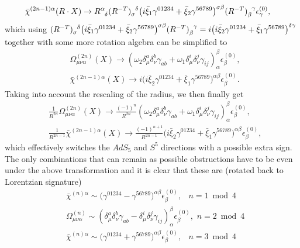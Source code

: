 \documentclass[12pt]{article}
\def\be{\begin{equation}}
\def\ee{\end{equation}}
\numberwithin{equation}{section}
\begin{document}
\begin{equation}
\begin{aligned}
	&\bar{\chi}^{(2n-1)\alpha}(R \cdot X) \to \tensor{R}{^\alpha_\delta} \tensor{(R^{-T})}{_\sigma^\delta} \big(i\bar{\xi}_1 \gamma^{01234} + \bar{\xi}_2\gamma^{56789}\big)^{\sigma \beta} \tensor{(R^{-T})}{_\beta^\gamma} \epsilon^{(0)}_\gamma,
\end{aligned}
\ee
which using $\tensor{(R^{-T})}{_\sigma^\delta} \big(i\bar{\xi}_1 \gamma^{01234} + \bar{\xi}_2 \gamma^{56789}\big)^{\sigma \beta} \tensor{(R^{-T})}{_\beta^\gamma} = i  \big(i \bar{\xi}_2 \gamma^{01234} + \bar{\xi}_1 \gamma^{56789}\big)^{\delta \gamma}$  together with some more rotation algebra can be simplified to
\be
\begin{aligned}
	& \Omega^{(2n)}_{\mu \nu \alpha}(X) \to  (\omega_2 \delta^a_\mu \delta^b_\nu \gamma_{ab} + \omega_1 \delta^i_\mu \delta^j_\nu \gamma_{ij})_\alpha^\beta \epsilon^{(0)}_\beta,\\
	&\bar{\chi}^{(2n-1)\alpha}(X) \to i \big(i\bar{\xi}_2 \gamma^{01234} + \bar{\xi}_1\gamma^{56789}\big)^{\alpha \beta} \epsilon^{(0)}_\beta.
\end{aligned}
\ee
Taking into account the rescaling of the radius, we then finally get
\be
\begin{aligned}
	& \frac{1}{R^{2n}} \Omega^{(2n)}_{\mu \nu \alpha}(X) \to \frac{(-1)^n}{R^{2n}} (\omega_2 \delta^a_\mu \delta^b_\nu \gamma_{ab} + \omega_1 \delta^i_\mu \delta^j_\nu \gamma_{ij})_\alpha^\beta \epsilon^{(0)}_\beta,\\
	&\frac{1}{R^{2n-1}} \bar{\chi}^{(2n-1)\alpha}(X) \to \frac{(-1)^{n+1}}{R^{2n-1}} \big(i\bar{\xi}_2 \gamma^{01234} + \bar{\xi}_1\gamma^{56789}\big)^{\alpha \beta} \epsilon^{(0)}_\beta,
\end{aligned}
\ee
which effectively switches the $AdS_5$ and $S^5$ directions with a possible extra sign. The only combinations that can remain as possible obstructions have to be even under the above transformation and it is clear that these are (rotated back to Lorentzian signature)
\be
\begin{aligned}
	&\bar{\chi}^{(n)\alpha} \sim \big(\gamma^{01234} - \gamma^{56789}\big)^{\alpha \beta} \epsilon^{(0)}_\beta, \,\,\,\,\, n = 1 \bmod 4 \\
	&\Omega_{\mu \nu \alpha}^{(n)} \sim (\delta^a_\mu \delta^b_\nu \gamma_{ab} - \delta^i_\mu \delta^j_\nu \gamma_{ij})_\alpha^\beta \epsilon^{(0)}_\beta, \,\, n = 2 \bmod 4 \\
	&\bar{\chi}^{(n)\alpha} \sim \big(\gamma^{01234} + \gamma^{56789}\big)^{\alpha \beta} \epsilon^{(0)}_\beta, \,\,\,\,\, n = 3 \bmod 4 \\

\end{aligned}
\end{equation}
\end{document}
